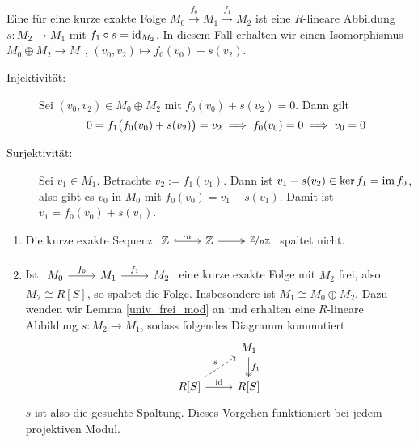 \begin{bemerkung}[{name=[Spaltung einer kurzen exakten Sequenz]}]
	Eine  für eine kurze exakte Folge $M_0 \xrightarrow{f_0} M_1 \xrightarrow{f_1} M_2$ ist eine $R$-lineare Abbildung $s \colon M_2 \to M_1$ mit $f_1 \circ s = \id_{M_2}$. In diesem Fall erhalten wir einen Isomorphismus $M_0 \oplus M_2 \to M_1$, $(v_0, v_2) \mapsto f_0(v_0) + s(v_2)$.
	\begin{description}
		\item[Injektivität:] Sei $(v_0,v_2) \in M_0 \oplus M_2$ mit $f_0(v_0) + s(v_2) =0$. Dann gilt
		\[
			0 = f_1 \enbrace[\big]{f_0(v_0) + s(v_2)} = v_2 \implies f_0(v_0)=0 \implies v_0 =0
		\]
		\item[Surjektivität:] Sei $v_1 \in M_1$. Betrachte $v_2 := f_1(v_1)$. Dann ist $v_1 -s(v_2) \in \ker f_1 = \im f_0$, also gibt es $v_0$ in $M_0$ mit
		$f_0(v_0) = v_1 - s(v_1)$. Damit ist $v_1= f_0(v_0)+ s(v_1)$.
	\end{description}
\end{bemerkung}

\begin{bemerkung}[{name=[{Existenz einer Spaltung, wenn $M_2$ frei ist}]}]
	\begin{enumerate}[1)]
		\item Die kurze exakte Sequenz $\begin{tikzcd}
			\mathbb{Z} \rar[hook,"\cdot n"] & \mathbb{Z} \rar[two heads] &  \nicefrac{\mathbb{Z}}{n \mathbb{Z}}
		\end{tikzcd}$
		spaltet nicht.
		\item Ist $\begin{tikzcd}
			M_0 \rar["f_0"] & M_1 \rar["f_1"] & M_2
		\end{tikzcd}$
		eine kurze exakte Folge mit $M_2$ frei, also $M_2 \cong R[S]$, so spaltet die Folge.
		Insbesondere ist $M_1 \cong M_0 \oplus M_2$.
		Dazu wenden wir Lemma \ref{univ_frei_mod} an und erhalten eine $R$-lineare Abbildung $s \colon M_2 \to M_1$, sodass folgendes Diagramm kommutiert
		\[
			\begin{tikzcd}
				\mbox{ } & M_1 \dar["f_1",two heads] \\
				R[S] \urar["s", dashed] \rar["\id"] &  R[S]
			\end{tikzcd}
		\]
		$s$ ist also die gesuchte Spaltung.
		Dieses Vorgehen funktioniert bei jedem projektiven Modul.
	\end{enumerate}
\end{bemerkung}

